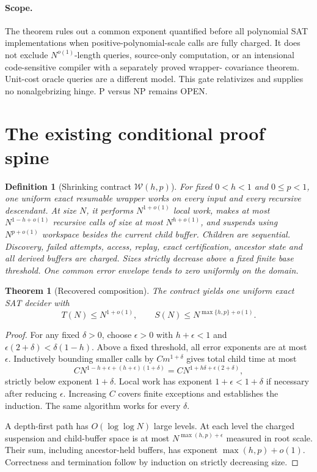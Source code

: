 \documentclass[11pt]{article}
\newtheorem{definition}{Definition}
\newtheorem{theorem}{Theorem}
\begin{document}
\paragraph{Scope.}
The theorem rules out a common exponent quantified before all polynomial SAT
implementations when positive-polynomial-scale calls are fully charged.  It
does not exclude \(N^{o(1)}\)-length queries, source-only computation, or an
intensional code-sensitive compiler with a separately proved wrapper-
covariance theorem. Unit-cost oracle queries are a different model. This
gate relativizes and supplies no nonalgebrizing hinge. P versus NP remains
OPEN.

\section{The existing conditional proof spine}

\begin{definition}[Shrinking contract $\mathcal W(h,p)$]
For fixed $0<h<1$ and $0\le p<1$, one uniform exact resumable wrapper works
on every input and every recursive descendant. At size $N$, it performs
$N^{1+o(1)}$ local work, makes at most $N^{1-h+o(1)}$ recursive calls
of size at most $N^{h+o(1)}$, and suspends using $N^{p+o(1)}$ workspace
besides the current child buffer. Children are sequential.
Discovery, failed attempts, access, replay, exact certification, ancestor
state and all derived buffers are charged. Sizes strictly decrease above
a fixed finite base threshold. One common error envelope tends to zero
uniformly on the domain.
\end{definition}

\begin{theorem}[Recovered composition]
The contract yields one uniform exact SAT decider with
\[
T(N)\le N^{1+o(1)},\qquad
S(N)\le N^{\max\{h,p\}+o(1)}.
\]
\end{theorem}

\begin{proof}
For any fixed $\delta>0$, choose $\epsilon>0$ with
$h+\epsilon<1$ and
$\epsilon(2+\delta)<\delta(1-h)$.
Above a fixed threshold, all error exponents are at most $\epsilon$.
Inductively bounding smaller calls by $Cm^{1+\delta}$ gives total child
time at most
\[
C N^{1-h+\epsilon+(h+\epsilon)(1+\delta)}
=C N^{1+h\delta+\epsilon(2+\delta)},
\]
strictly below exponent $1+\delta$. Local work has exponent
$1+\epsilon<1+\delta$ if necessary after reducing $\epsilon$.
Increasing $C$ covers finite exceptions and establishes the induction.
The same algorithm works for every $\delta$.

A depth-first path has $O(\log\log N)$ large levels. At each level the
charged suspension and child-buffer space is at most
$N^{\max(h,p)+\epsilon}$ measured in root scale.
Their sum, including ancestor-held buffers, has exponent
$\max(h,p)+o(1)$. Correctness and termination follow by induction on
strictly decreasing size.
\end{proof}
\end{document}
